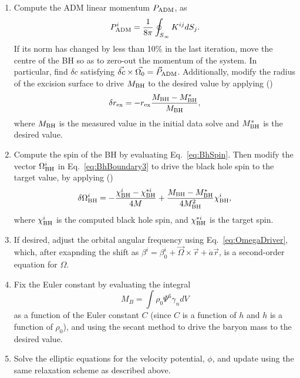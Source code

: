 \begin{enumerate}
\item Compute the ADM linear momentum $P_{\rm ADM}$, as 
\begin{equation}
P_{\rm ADM}^i = \frac{1}{8\pi}\oint_{S_{\infty}}K^{ij}dS_j.
\end{equation}
If its norm has changed by less than 10\% in the last iteration, move
the centre of the BH so as to zero-out the momentum of the
system. In particular, find $\delta c$ satisfying $\vec{\delta c}
\times \vec{\Omega_0}=\vec{P}_{\rm ADM}$. Additionally, modify the radius of the excision surface to
drive $M_{\rm BH}$ to the desired value by applying (\cite{Buchman:2012dw})
\begin{equation}
\delta r_{\rm ex} = -r_{\rm ex} \frac{M_{\rm BH} - M_{\rm
    BH}^{*}}{M_{\rm BH}},
\end{equation}
where $M_{\rm BH}$ is the measured value in the initial data solve and
$M_{\rm BH}^{*}$ is the desired value.

\item Compute the spin of the BH by evaluating Eq.~\ref{eq:BhSpin}. Then
  modify the vector $\Omega^i_{\rm BH}$ in Eq.~\ref{eq:BhBoundary3} to drive
  the black hole spin to the target value,  by applying (\cite{Buchman:2012dw})
\begin{equation}
\delta \Omega_{\rm BH}^i = -\frac{\chi^i_{\rm BH}-\chi_{\rm
    BH}^{*i}}{4M}+\frac{M_{\rm BH}-M_{\rm BH}^{*}}{4M_{\rm
    BH}^2}\chi_{\rm BH}^i,
\end{equation}
where $\chi^i_{\rm BH}$ is the computed black hole spin, and $\chi_{\rm
    BH}^{*i}$ is the target spin.

\item
\label{it:omega}
 If desired, adjust the orbital angular frequency using
  Eq.~\ref{eq:OmegaDriver}, which, after exapnding the shift as 
$\beta^i=\beta^i_0 +
\vec{\Omega}\times\vec{r} + \dot{a}\vec{r}$, is a second-order
equation for $\Omega$.

\item Fix the Euler constant by evaluating the integral
\begin{equation}
M_{B}=\int \rho_0\Psi^6\gamma_ndV
\end{equation}
as a function of the Euler
constant $C$ (since $C$ is a function of $h$ and $h$ is a function of $\rho_0$), and using the secant method to drive the baryon mass to the
desired value.

\item Solve the elliptic equations for the velocity potential, $\phi$,
  and update using the same relaxation scheme as described above.


\end{enumerate}
